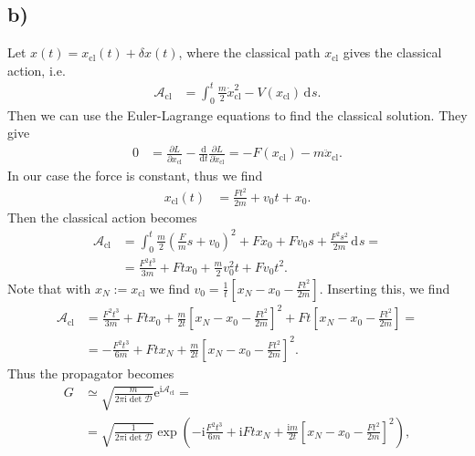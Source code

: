 \documentclass[english, parskip=full]{scrartcl}
\newcommand{\intr}{}
\newcommand{\kla}{}
\newcommand{\klam}{}
\newcommand{\tecxt}{}
\renewcommand{\i}{\text{i}}
\newcommand{\e}{\text{e}}
\begin{document}
\subsection*{b)}
Let $x(t) = x_\tecxt\text{cl}(t) + \delta x(t)$, where the classical path $x_\tecxt\text{cl}$ gives the classical action, i.e.
\begin{align}
\mathcal{A}_\tecxt\text{cl} &= \intr\int_{0}^t \frac{m}{2}\dot{x}_\tecxt\text{cl}^2 - V(x_\tecxt\text{cl}) \, \mathrm{d}^{ }s.
\end{align}
Then we can use the Euler-Lagrange equations to find the classical solution.
They give
\begin{align}
0 &= \frac{\partial L}{\partial x_\tecxt\text{cl}} - \frac{\tecxt\text{d}}{\tecxt\text{d}t}\frac{\partial L}{\partial \dot{x}_\tecxt\text{cl}} = -F(x_\tecxt\text{cl}) - m\ddot{x}_\tecxt\text{cl}.
\end{align}
In our case the force is constant, thus we find
\begin{align}
x_\tecxt\text{cl}(t) &= \frac{Ft^2}{2m} + v_0t + x_0.
\end{align}
Then the classical action becomes
\begin{align}
\mathcal{A}_\tecxt\text{cl} &= \intr\int_{0}^t \frac{m}{2}\kla\left( \frac{F}{m}s + v_0 \right)^2 + Fx_0 + Fv_0s + \frac{F^2s^2}{2m} \, \mathrm{d}^{ }s = \\
&= \frac{F^2t^3}{3m} + Ftx_0 + \frac{m}{2}v_0^2t + Fv_0 t^2. 
\end{align}
Note that with $x_N := x_\tecxt\text{cl}$ we find $v_0 = \frac{1}{t}\klam\left[ x_N - x_0 - \frac{Ft^2}{2m} \right]$.
Inserting this, we find
\begin{align}
\mathcal{A}_\tecxt\text{cl} &= \frac{F^2t^3}{3m} + Ftx_0 + \frac{m}{2t}\klam\left[ x_N - x_0 - \frac{Ft^2}{2m} \right]^2 + Ft \klam\left[ x_N - x_0 - \frac{Ft^2}{2m} \right] = \\
&= -\frac{F^2t^3}{6m} + Ftx_N + \frac{m}{2t}\klam\left[ x_N - x_0 - \frac{Ft^2}{2m} \right]^2.
\end{align}
Thus the propagator becomes
\begin{align}
G &\simeq \sqrt{\frac{m}{2\pi\i \det\mathcal{D}}} \e^{\i\mathcal{A}_\tecxt\text{cl}} = \\
&= \sqrt{\frac{1}{2\pi\i \det\mathcal{D}}} \exp\kla\left( -\i \frac{F^2t^3}{6m} + \i Ftx_N + \frac{\i m}{2t}\klam\left[ x_N - x_0 - \frac{Ft^2}{2m} \right]^2 \right),
\end{align}
\end{document}
